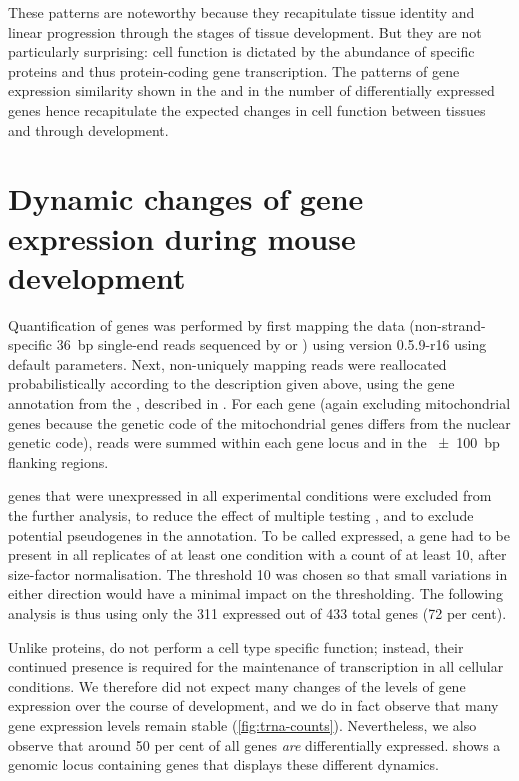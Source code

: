 These patterns are noteworthy because they recapitulate tissue identity and
linear progression through the stages of tissue development. But they are not
particularly surprising: cell function is dictated by the abundance of specific
proteins and thus protein-coding gene transcription. The patterns of gene
expression similarity shown in the \pca and in the number of differentially
expressed genes hence recapitulate the expected changes in cell function between
tissues and through development.

\section{Dynamic changes of  gene expression during mouse
development}

Quantification of \trna genes was performed by first mapping the  \chipseq
data (non-strand-specific \SI{36}{bp} single-end reads sequenced by
  or ) using
 version 0.5.9-r16 \citep{Li:2009a} using default parameters.
Next, non-uniquely mapping reads were reallocated probabilistically according to
the description given above, using the \trna gene annotation from the
, described in \citet{Chan:2009}. For each \trna
gene (again excluding mitochondrial \trna genes because the genetic code of the
mitochondrial \mrna genes differs from the nuclear genetic code), reads were
summed within each \trna gene locus and in the \SI{\pm100}{bp} flanking regions.

\trna genes that were unexpressed in all experimental conditions were excluded
from the further analysis, to reduce the effect of multiple testing
\citep{Bourgon:2010}, and to exclude potential pseudogenes in the annotation. To
be called expressed, a \trna gene had to be present in all replicates of at
least one condition with a count of at least \num{10}, after size-factor
normalisation. The threshold \num{10} was chosen so that small variations in
either direction would have a minimal impact on the thresholding. The following
analysis is thus using only the \num{311} expressed out of \num{433} total genes
(\num{72} per cent).

Unlike proteins, \trna[s] do not perform a cell type specific function; instead,
their continued presence is required for the maintenance of transcription in all
cellular conditions. We therefore did not expect many changes of the levels of
\trna gene expression over the course of development, and we do in fact observe
that many \trna gene expression levels remain stable (\cref{fig:trna-counts}).
Nevertheless, we also observe that around \num{50} per cent of all \trna genes
\emph{are} differentially expressed. 
shows a genomic locus containing \trna genes that displays these different
dynamics.

